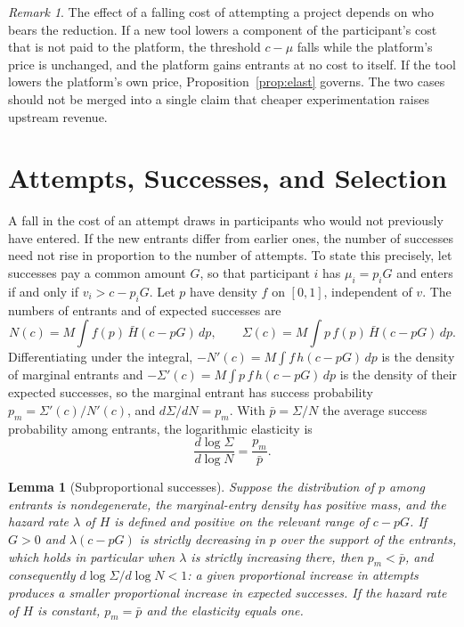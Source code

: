 \documentclass[11pt]{article}
\newtheorem{lemma}{Lemma}
\theoremstyle{remark}
\newtheorem{remark}{Remark}
\newcommand{\Hbar}{\bar H}
\begin{document}
\begin{remark}
The effect of a falling cost of attempting a project depends on who bears the reduction. If a new tool lowers a component of the participant's cost that is not paid to the platform, the threshold $c-\mu$ falls while the platform's price is unchanged, and the platform gains entrants at no cost to itself. If the tool lowers the platform's own price, Proposition~\ref{prop:elast} governs. The two cases should not be merged into a single claim that cheaper experimentation raises upstream revenue.
\end{remark}

\section{Attempts, Successes, and Selection}\label{sec:select}

A fall in the cost of an attempt draws in participants who would not previously have entered. If the new entrants differ from earlier ones, the number of successes need not rise in proportion to the number of attempts. To state this precisely, let successes pay a common amount $G$, so that participant $i$ has $\mu_i=p_iG$ and enters if and only if $v_i>c-p_iG$. Let $p$ have density $f$ on $[0,1]$, independent of $v$. The numbers of entrants and of expected successes are
\[
N(c)=M\!\int f(p)\,\Hbar(c-pG)\,dp, \qquad \Sigma(c)=M\!\int p\,f(p)\,\Hbar(c-pG)\,dp .
\]
Differentiating under the integral, $-N'(c)=M\!\int f\,h(c-pG)\,dp$ is the density of marginal entrants and $-\Sigma'(c)=M\!\int p\,f\,h(c-pG)\,dp$ is the density of their expected successes, so the marginal entrant has success probability $p_m=\Sigma'(c)/N'(c)$, and $d\Sigma/dN=p_m$. With $\bar p=\Sigma/N$ the average success probability among entrants, the logarithmic elasticity is
\[
\frac{d\log\Sigma}{d\log N}=\frac{p_m}{\bar p}.
\]

\begin{lemma}[Subproportional successes]\label{lem:margin}
Suppose the distribution of $p$ among entrants is nondegenerate, the marginal-entry density has positive mass, and the hazard rate $\lambda$ of $H$ is defined and positive on the relevant range of $c-pG$. If $G>0$ and $\lambda(c-pG)$ is strictly decreasing in $p$ over the support of the entrants, which holds in particular when $\lambda$ is strictly increasing there, then $p_m<\bar p$, and consequently $d\log\Sigma/d\log N<1$: a given proportional increase in attempts produces a smaller proportional increase in expected successes. If the hazard rate of $H$ is constant, $p_m=\bar p$ and the elasticity equals one.
\end{lemma}
\end{document}
